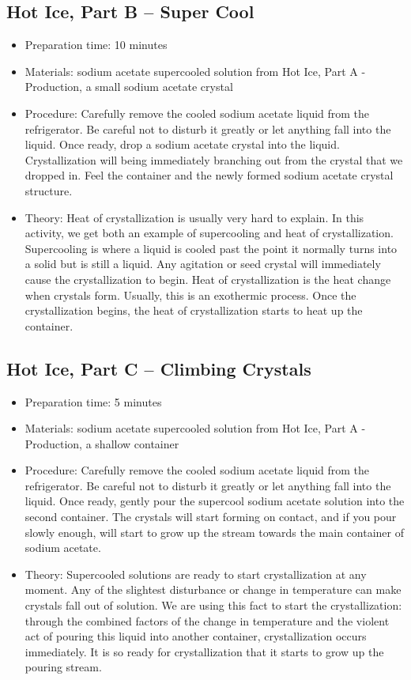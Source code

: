 \subsection{Hot Ice, Part B – Super Cool}
\begin{itemize}
\item{Preparation time: 10 minutes}
\item{Materials: sodium acetate supercooled solution from Hot Ice, Part A - Production, a small sodium acetate crystal}
\item{Procedure: Carefully remove the cooled sodium acetate liquid from the refrigerator. Be careful not to disturb it greatly or let anything fall into the liquid. Once ready, drop a sodium acetate crystal into the liquid. Crystallization will being immediately branching out from the crystal that we dropped in. Feel the container and the newly formed sodium acetate crystal structure.}
\item{Theory: Heat of crystallization is usually very hard to explain. In this activity, we get both an example of supercooling and heat of crystallization. Supercooling is where a liquid is cooled past the point it normally turns into a solid but is still a liquid. Any agitation or seed crystal will immediately cause the crystallization to begin. Heat of crystallization is the heat change when crystals form. Usually, this is an exothermic process. Once the crystallization begins, the heat of crystallization starts to heat up the container.}
\end{itemize}

\subsection{Hot Ice, Part C – Climbing Crystals}
\begin{itemize}
\item{Preparation time: 5 minutes}
\item{Materials: sodium acetate supercooled solution from Hot Ice, Part A - Production, a shallow container}
\item{Procedure: Carefully remove the cooled sodium acetate liquid from the refrigerator. Be careful not to disturb it greatly or let anything fall into the liquid. Once ready, gently pour the supercool sodium acetate solution into the second container. The crystals will start forming on contact, and if you pour slowly enough, will start to grow up the stream towards the main container of sodium acetate.}
\item{Theory: Supercooled solutions are ready to start crystallization at any moment. Any of the slightest disturbance or change in temperature can make crystals fall out of solution. We are using this fact to start the crystallization: through the combined factors of the change in temperature and the violent act of pouring this liquid into another container, crystallization occurs immediately. It is so ready for crystallization that it starts to grow up the pouring stream.}
\end{itemize}

